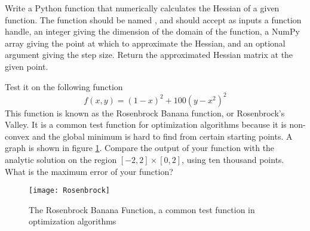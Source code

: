 \begin{problem}
Write a Python function that numerically calculates the Hessian of a given function. 
The function should be named , and should accept as inputs a function handle, 
an integer giving the dimension of the domain of the function, a NumPy 
array giving the point at which to approximate the Hessian, and an optional argument giving the 
step size.
Return the approximated Hessian matrix at the given point.

Test it on the following function
\begin{equation*}
f(x,y) = (1-x)^2 + 100(y-x^2)^2
\end{equation*}
This function is known as the Rosenbrock Banana function, or Rosenbrock's Valley. It is a common test function for optimization algorithms because it is non-convex and the global minimum is hard to find from certain starting points. A graph is shown in figure \ref{Fig:Rosenbrock}. Compare the output of your function with the analytic solution on the region $[-2,2] \times [0,2]$, using ten thousand points. What is the maximum error of your function?
\end{problem}
\begin{figure}
\begin{center}
\texttt{[image: Rosenbrock]}
\caption{The Rosenbrock Banana Function, a common test function in optimization algorithms}
\label{Fig:Rosenbrock}
\end{center}
\end{figure}
